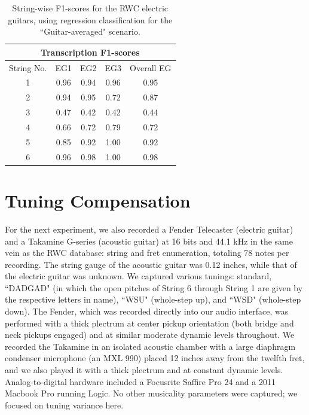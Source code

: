 \documentclass[12pt]{cmuthesis}
\begin{document}
\begin{table}[!htbp]
\begin{center}
\begin{tabular}{||c||c|c|c|c||}
\hline
\multicolumn{5}{||c||}{\bf{Transcription F1-scores}} \\
\hline
String No. & EG1 & EG2 & EG3 & Overall EG\\
\hline
1 & 0.96 & 0.94 & 0.96 & 0.95 \\
\hline
2 & 0.94 & 0.95 & 0.72 & 0.87\\
\hline
3 & 0.47 & 0.42 & 0.42 &  0.44\\
\hline
4 & 0.66 & 0.72 & 0.79 &  0.72\\
\hline
5 & 0.85 & 0.92 & 1.00 &  0.92 \\
\hline
6 & 0.96 & 0.98 & 1.00 &  0.98 \\ 
\hline
\hline
\end{tabular}
\caption{String-wise F1-scores for the RWC electric guitars, using regression classification for the ``Guitar-averaged" scenario.} 
\label{tab:eg-str-f}
\end{center}
\end{table}

\section{Tuning Compensation}
For the next experiment, we also recorded a Fender Telecaster (electric guitar) and a Takamine G-series (acoustic guitar) at 16 bits and 44.1 kHz in the same vein as the RWC database: string and fret enumeration, totaling 78 notes per recording. The string gauge of the acoustic guitar was 0.12 inches, while that of the electric guitar was unknown. We captured various tunings: standard, ``DADGAD" (in which the open pitches of String 6 through String 1 are given by the respective letters in name), ``WSU" (whole-step up), and ``WSD" (whole-step down). The Fender, which was recorded directly into our audio interface, was performed with a thick plectrum at center pickup orientation (both bridge and neck pickups engaged) and at similar moderate dynamic levels throughout. We recorded the Takamine in an isolated acoustic chamber with a large diaphragm condenser microphone (an MXL 990) placed 12 inches away from the twelfth fret, and we also played it with a thick plectrum and at constant dynamic levels. Analog-to-digital hardware included a Focusrite Saffire Pro 24 and a 2011 Macbook Pro running Logic. No other musicality parameters were captured; we focused on tuning variance here.
\end{document}
